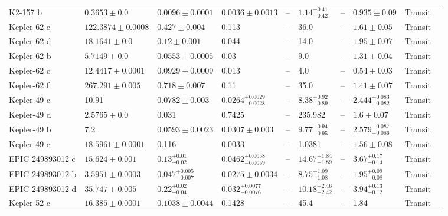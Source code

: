 \begin{tabular}{llllllllll}
K2-157 b & $0.3653 \pm 0.0$ & $0.0096 \pm 0.0001$ & $0.0036 \pm 0.0013$ & -- & $1.14^{+0.41}_{-0.42}$ & -- & $0.935 \pm 0.09$ & Transit & \cite{CASTRO_GONZALEZ_ET_AL_2025} \\
Kepler-62 e & $122.3874 \pm 0.0008$ & $0.427 \pm 0.004$ & 0.113 & -- & 36.0 & -- & $1.61 \pm 0.05$ & Transit & \cite{BORUCKI_ET_AL__2013} \\
Kepler-62 d & $18.1641 \pm 0.0$ & $0.12 \pm 0.001$ & 0.044 & -- & 14.0 & -- & $1.95 \pm 0.07$ & Transit & \cite{BORUCKI_ET_AL__2013} \\
Kepler-62 b & $5.7149 \pm 0.0$ & $0.0553 \pm 0.0005$ & 0.03 & -- & 9.0 & -- & $1.31 \pm 0.04$ & Transit & \cite{BORUCKI_ET_AL__2013} \\
Kepler-62 c & $12.4417 \pm 0.0001$ & $0.0929 \pm 0.0009$ & 0.013 & -- & 4.0 & -- & $0.54 \pm 0.03$ & Transit & \cite{BORUCKI_ET_AL__2013} \\
Kepler-62 f & $267.291 \pm 0.005$ & $0.718 \pm 0.007$ & 0.11 & -- & 35.0 & -- & $1.41 \pm 0.07$ & Transit & \cite{BORUCKI_ET_AL__2013} \\
Kepler-49 c & 10.91 & $0.0782 \pm 0.003$ & $0.0264^{+0.0029}_{-0.0028}$ & -- & $8.38^{+0.92}_{-0.89}$ & -- & $2.444^{+0.083}_{-0.082}$ & Transit & \cite{LELEU_ET_AL__2023} \\
Kepler-49 d & $2.5765 \pm 0.0$ & 0.031 & 0.7425 & -- & 235.982 & -- & $1.6 \pm 0.07$ & Transit & \cite{ROWE_ET_AL__2014} \\
Kepler-49 b & 7.2 & $0.0593 \pm 0.0023$ & $0.0307 \pm 0.003$ & -- & $9.77^{+0.94}_{-0.95}$ & -- & $2.579^{+0.087}_{-0.086}$ & Transit & \cite{LELEU_ET_AL__2023} \\
Kepler-49 e & $18.5961 \pm 0.0001$ & 0.116 & 0.0033 & -- & 1.0381 & -- & $1.56 \pm 0.08$ & Transit & \cite{ROWE_ET_AL__2014} \\
EPIC 249893012 c & $15.624 \pm 0.001$ & $0.13^{+0.01}_{-0.02}$ & $0.0462^{+0.0058}_{-0.0059}$ & -- & $14.67^{+1.84}_{-1.89}$ & -- & $3.67^{+0.17}_{-0.14}$ & Transit & \cite{HIDALGO_ET_AL__2020} \\
EPIC 249893012 b & $3.5951 \pm 0.0003$ & $0.047^{+0.005}_{-0.007}$ & $0.0275 \pm 0.0034$ & -- & $8.75^{+1.09}_{-1.08}$ & -- & $1.95^{+0.09}_{-0.08}$ & Transit & \cite{HIDALGO_ET_AL__2020} \\
EPIC 249893012 d & $35.747 \pm 0.005$ & $0.22^{+0.02}_{-0.04}$ & $0.032^{+0.0077}_{-0.0076}$ & -- & $10.18^{+2.46}_{-2.42}$ & -- & $3.94^{+0.13}_{-0.12}$ & Transit & \cite{HIDALGO_ET_AL__2020} \\
Kepler-52 c & $16.385 \pm 0.0001$ & $0.1038 \pm 0.0044$ & 0.1428 & -- & 45.4 & -- & 1.84 & Transit & \cite{STEFFEN_ET_AL__2013} \\

\end{tabular}
